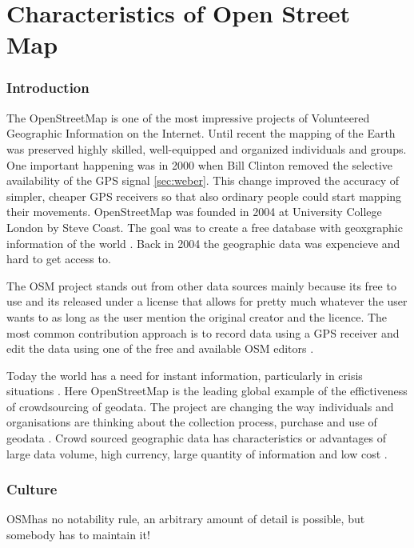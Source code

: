 \chapter{Characteristics of Open Street Map}
	
\subsection{Introduction}
The OpenStreetMap is one of the most impressive projects of Volunteered Geographic Information on the Internet\cite{Neis2012}. Until recent the mapping of the Earth was preserved highly skilled, well-equipped and organized individuals and groups. One important happening was in 2000 when Bill Clinton removed the selective availability of the GPS signal \ref{sec:weber}. This change improved the accuracy of simpler, cheaper GPS receivers so that also ordinary people could start mapping their movements. OpenStreetMap was founded in 2004 at University College London by Steve Coast. The goal was to create a free database with geoxgraphic information of the world \cite{Neis2012}. Back in 2004 the geographic data was expencieve and hard to get access to. 

The OSM project stands out from other data sources mainly because its free to use and its released under a license that allows for pretty much whatever the user wants to as long as the user mention the original creator and the licence\cite{Chilton}.  The most common contribution approach is to record data using a GPS receiver and edit the data using one of the free and available OSM editors \cite{Neis2012}.  

Today the world has a need for instant information, particularly in crisis situations \cite{Chilton}. Here OpenStreetMap is the leading global example of the effictiveness of crowdsourcing of geodata. The project are changing the way individuals and organisations are thinking about the collection process, purchase and use of geodata \cite{Chilton}.  Crowd sourced geographic data has characteristics or advantages of large data volume, high currency, large quantity of information and low cost \cite{Wang2013}.  

\subsection{Culture}
OSMhas no notability rule, an arbitrary amount of detail is possible, but somebody has to maintain it! %

